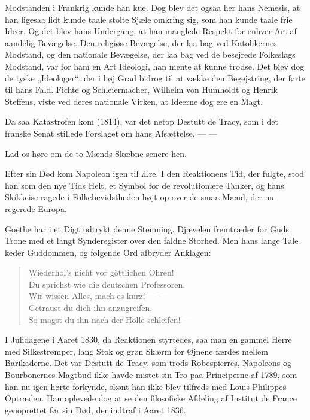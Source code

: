 \documentclass[12pt,a4paper,openany]{book}
\newcommand{\opage}[1]{\marginnote{\footnotesize\textit{[#1]}}}
\begin{document}
Modstanden i Frankrig kunde han kue. Dog blev det
ogsaa her hans Nemesis, at han ligesaa lidt kunde taale stolte
Sjæle omkring sig, som han kunde taale frie Ideer. Og det
blev hans Undergang, at han manglede Respekt for enhver
Art af aandelig Bevægelse. Den religiøse Bevægelse, der laa
bag ved Katolikernes Modstand, og den nationale Bevægelse,
der laa bag ved de besejrede Folkeslags Modstand, var for ham
en Art Ideologi, han mente at kunne trodse. Det blev dog de
tyske „Ideologer“, der i høj Grad bidrog til at vække den Begejstring,
der førte til hans Fald. Fichte og Schleiermacher,
Wilhelm von Humholdt og Henrik Steffens, viste ved deres nationale
Virken, at Ideerne dog ere en Magt.

Da saa Katastrofen kom (1814), var det netop Destutt de
Tracy, som i det franske Senat stillede Forslaget om hans Afsættelse. --- ---


Lad os høre om de to Mænds Skæbne senere hen.

Efter sin Død kom Napoleon igen til Ære. I den Reaktionens
Tid, der fulgte, stod han som den nye Tids Helt, et
Symbol for de revolutionære Tanker, og hans Skikkeise ragede
i Folkebevidstheden højt op over de smaa Mænd, der nu regerede
Europa.

Goethe har i et Digt udtrykt denne Stemning. Djævelen
fremtræder for Guds Trone med et langt Synderegister over
den faldne Storhed. Men hans lange Tale keder Guddommen,
og følgende Ord afbryder Anklagen:
\begin{quote}
Wiederhol’s nicht vor göttlichen Ohren!\\
Du sprichst wie die deutschen Professoren.\\
Wir wissen Alles, mach es kurz! --- ---\\
Getraust du dich ihn anzugreifen,\\
So magst du ihn nach der Hölle schleifen! ---
\end{quote}

\setcounter{footnote}{0}%
\opage{188}I Julidagene i Aaret 1830, da Reaktionen styrtedes, saa
man en gammel Herre med Silkestrømper, lang Stok og grøn
Skærm for Øjnene færdes mellem Barikaderne. Det var Destutt
de Tracy, som trods Robespierres, Napoleons og Bourbonernes
Magtbud ikke havde mistet sin Tro paa Principerne af 1789,
som han nu igen hørte forkynde, skønt han ikke blev tilfreds
med Louis Philippes Optræden. Han oplevede dog at se den
filosofiske Afdeling af Institut de France genoprettet før sin
Død, der indtraf i Aaret 1836.
\end{document}

